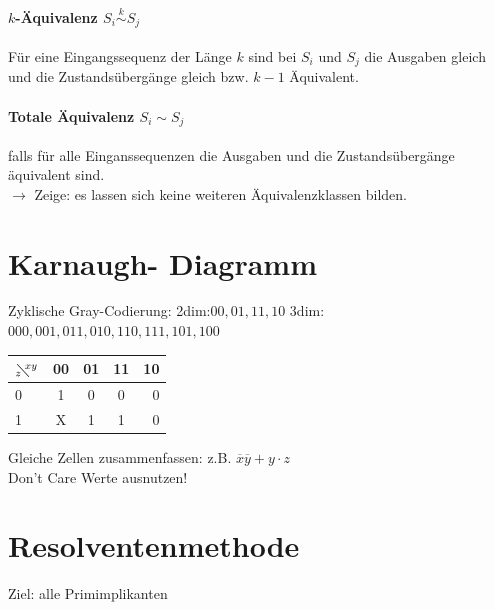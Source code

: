 \documentclass[6pt,a4paper]{scrartcl}
\newcommand{\ra}[0]{\ensuremath{\rightarrow}} 									%
\begin{document}
\begin{multicols}{3}
\paragraph{$k$-Äquivalenz $S_i \stackrel{k}{\sim} S_j$} 
Für eine Eingangssequenz der Länge $k$ sind bei $S_i$ und $S_j$ die Ausgaben gleich und die Zustandsübergänge gleich bzw. $k-1$ Äquivalent.\\
\paragraph{Totale Äquivalenz $S_i \sim S_j$} falls für alle Einganssequenzen die Ausgaben und die Zustandsübergänge äquivalent sind. \\ $\ra$ Zeige: es lassen sich keine weiteren Äquivalenzklassen bilden.\\


\section{Karnaugh- Diagramm} %
	Zyklische Gray-Codierung: 2dim:$00,01,11,10$ 3dim:$000,001,011,010,110,111,101,100$
	
\begin{tabular}{l | c | c |  c | r}
$_z\!\!\diagdown \!\!^{xy}$ & 00 	& 	01	&	11 	&	10	 	\\ \midrule
0		&	1 \cellcolor{gray}	&	0	&	0	&	0		\\	
1		&	X \cellcolor{gray}	&	1 \cellcolor{lightgray}	&	1 \cellcolor{lightgray}	&	0		\\	
\end{tabular}
Gleiche Zellen zusammenfassen: z.B. $\overline x \overline y + y \cdot z$\\
Don't Care Werte ausnutzen!\\


\section{Resolventenmethode} %
\label{sec:Resolventenmethode}
	Ziel: alle Primimplikanten \\
	

\end{multicols}
\end{document}
